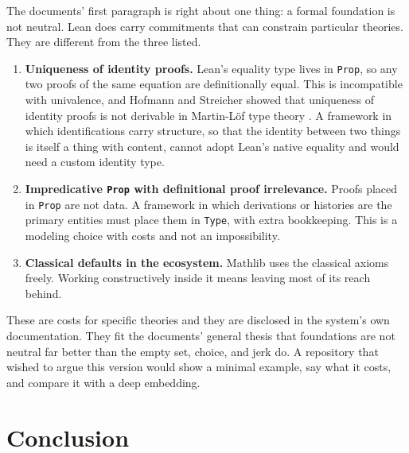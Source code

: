 \documentclass[11pt]{article}
\begin{document}
The documents' first paragraph is right about one thing: a formal foundation is not neutral. Lean does carry commitments that can constrain particular theories. They are different from the three listed.
\begin{enumerate}[leftmargin=2em]
\item \textbf{Uniqueness of identity proofs.} Lean's equality type lives in \texttt{Prop}, so any two proofs of the same equation are definitionally equal. This is incompatible with univalence, and Hofmann and Streicher showed that uniqueness of identity proofs is not derivable in Martin-L\"of type theory \cite{hofmann1998}. A framework in which identifications carry structure, so that the identity between two things is itself a thing with content, cannot adopt Lean's native equality and would need a custom identity type.
\item \textbf{Impredicative \texttt{Prop} with definitional proof irrelevance.} Proofs placed in \texttt{Prop} are not data. A framework in which derivations or histories are the primary entities must place them in \texttt{Type}, with extra bookkeeping. This is a modeling choice with costs and not an impossibility.
\item \textbf{Classical defaults in the ecosystem.} Mathlib uses the classical axioms freely. Working constructively inside it means leaving most of its reach behind.
\end{enumerate}
These are costs for specific theories and they are disclosed in the system's own documentation. They fit the documents' general thesis that foundations are not neutral far better than the empty set, choice, and jerk do. A repository that wished to argue this version would show a minimal example, say what it costs, and compare it with a deep embedding.

\section{Conclusion}
\end{document}
